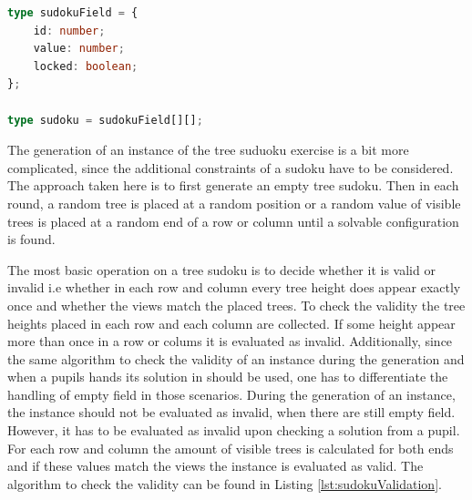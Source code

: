 \begin{lstlisting}[language=TypeScript,caption={Definition of the custom sudoku and sudokuField type},label={lst:sudokuType}]
type sudokuField = {
    id: number;
    value: number;
    locked: boolean;
};

type sudoku = sudokuField[][];
\end{lstlisting}

The generation of an instance of the tree suduoku exercise is a bit more complicated, since the additional constraints of a sudoku have to be considered. The approach taken here is to first generate an empty tree sudoku. Then in each round, a random tree is placed at a random position or a random value of visible trees is placed at a random end of a row or column until a solvable configuration is found. 

The most basic operation on a tree sudoku is to decide whether it is valid or invalid i.e whether in each row and column every tree height does appear exactly once and whether the views match the placed trees.
To check the validity the tree heights placed in each row and each column are collected. If some height appear more than once in a row or colums it is evaluated as invalid. Additionally, since the same algorithm to check the validity of an instance during the generation and when a pupils hands its solution in should be used, one has to differentiate the handling of empty field in those scenarios. During the generation of an instance, the instance should not be evaluated as invalid, when there are still empty field. However, it has to be evaluated as invalid upon checking a solution from a pupil. 
For each row and column the amount of visible trees is calculated for both ends and if these values match the views the instance is evaluated as valid. The algorithm to check the validity can be found in Listing \ref{lst:sudokuValidation}.

